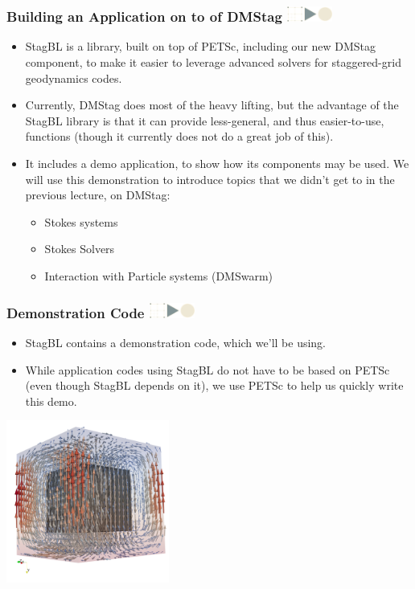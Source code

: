 \documentclass{beamer}
\newcommand\frametitlelogo[1]{\frametitle{#1\hspace{0pt plus 1 filll} \includegraphics[width=42pt]{logo_slides}}}
\begin{document}
\begin{frame}[fragile]
  \frametitlelogo{Building an Application on to of DMStag}
  \begin{itemize}
      \item
  StagBL is a library, built on top of PETSc, including our new DMStag component,
  to make it easier to leverage advanced solvers for staggered-grid geodynamics
  codes.
\item Currently, DMStag does most of the heavy lifting, but the advantage of the StagBL library is that it can provide less-general, and thus easier-to-use, functions (though it currently does not do a great job of this).
  \item
  It includes a demo application, to show how its components may be used.
  We will use this demonstration to introduce topics that we didn't get
  to in the previous lecture, on DMStag:
  \begin{itemize}
      \item Stokes systems
      \item Stokes Solvers
      \item Interaction with Particle systems (DMSwarm)
  \end{itemize}
  \end{itemize}
\end{frame}

\begin{frame}[fragile]
  \frametitlelogo{Demonstration Code}
  \begin{itemize}
      \item
  StagBL contains a demonstration code, which we'll be using.
\item
  While application codes using StagBL do not have to be based on PETSc
  (even though StagBL depends on it), we use PETSc to help us quickly write this demo.
  \end{itemize}
  \begin{center}
  \includegraphics[width=0.4\textwidth]{images/3d_sinker_box_20.png}
  \end{center}

\end{frame}
\end{document}
